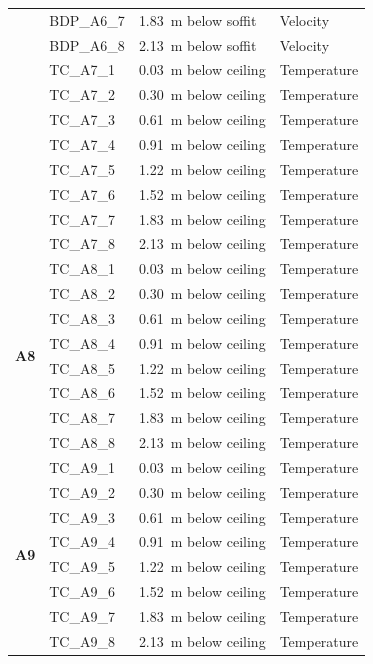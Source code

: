 \documentclass[12pt,oneside]{book}
\begin{document}
\begin{longtable}[c]{c|lll}
 & BDP\_A6\_7 & 1.83~m below soffit  & Velocity \\
 & BDP\_A6\_8 & 2.13~m below soffit  & Velocity \\
\bottomrule
\newpage
\multirow{8}{*}{\large{\textbf{A7}}}
 & TC\_A7\_1  & 0.03~m below ceiling & Temperature \\
 & TC\_A7\_2  & 0.30~m below ceiling & Temperature \\
 & TC\_A7\_3  & 0.61~m below ceiling & Temperature \\
 & TC\_A7\_4  & 0.91~m below ceiling & Temperature \\
 & TC\_A7\_5  & 1.22~m below ceiling & Temperature \\
 & TC\_A7\_6  & 1.52~m below ceiling & Temperature \\
 & TC\_A7\_7  & 1.83~m below ceiling & Temperature \\
 & TC\_A7\_8  & 2.13~m below ceiling & Temperature \\
\midrule
\multirow{8}{*}{\large{\textbf{A8}}}
 & TC\_A8\_1  & 0.03~m below ceiling & Temperature \\
 & TC\_A8\_2  & 0.30~m below ceiling & Temperature \\
 & TC\_A8\_3  & 0.61~m below ceiling & Temperature \\
 & TC\_A8\_4  & 0.91~m below ceiling & Temperature \\
 & TC\_A8\_5  & 1.22~m below ceiling & Temperature \\
 & TC\_A8\_6  & 1.52~m below ceiling & Temperature \\
 & TC\_A8\_7  & 1.83~m below ceiling & Temperature \\
 & TC\_A8\_8  & 2.13~m below ceiling & Temperature \\
\midrule
\multirow{8}{*}{\large{\textbf{A9}}}
 & TC\_A9\_1  & 0.03~m below ceiling & Temperature \\
 & TC\_A9\_2  & 0.30~m below ceiling & Temperature \\
 & TC\_A9\_3  & 0.61~m below ceiling & Temperature \\
 & TC\_A9\_4  & 0.91~m below ceiling & Temperature \\
 & TC\_A9\_5  & 1.22~m below ceiling & Temperature \\
 & TC\_A9\_6  & 1.52~m below ceiling & Temperature \\
 & TC\_A9\_7  & 1.83~m below ceiling & Temperature \\
 & TC\_A9\_8  & 2.13~m below ceiling & Temperature \\
\bottomrule

\end{longtable}
\end{document}
